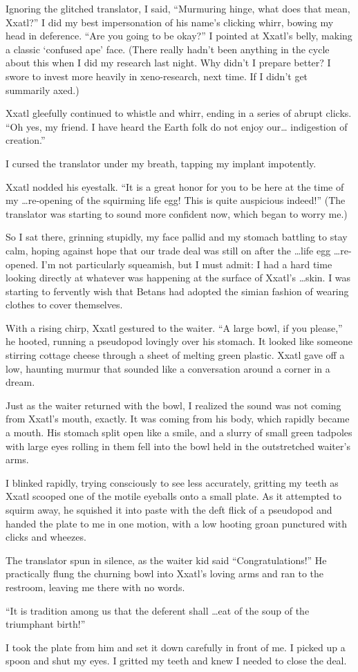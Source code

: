Ignoring the glitched translator, I said, ``Murmuring hinge, what does
that mean, Xxatl?'' I did my best impersonation of his name's clicking
whirr, bowing my head in deference. ``Are you going to be okay?'' I
pointed at Xxatl's belly, making a classic `confused ape' face. (There
really hadn't been anything in the cycle about this when I did my
research last night. Why didn't I prepare better? I swore to invest more
heavily in xeno-research, next time. If I didn't get summarily axed.)

Xxatl gleefully continued to whistle and whirr, ending in a series of
abrupt clicks. ``Oh yes, my friend. I have heard the Earth folk do not
enjoy our\ldots{} indigestion of creation.''

I cursed the translator under my breath, tapping my implant impotently.

Xxatl nodded his eyestalk. ``It is a great honor for you to be here at
the time of my \ldots re-opening of the squirming life egg! This is quite
auspicious indeed!'' (The translator was starting to sound more
confident now, which began to worry me.)

So I sat there, grinning stupidly, my face pallid and my stomach
battling to stay calm, hoping against hope that our trade deal was still
on after the \ldots life egg \ldots re-opened. I'm not particularly squeamish,
but I must admit: I had a hard time looking directly at whatever was
happening at the surface of Xxatl's \ldots skin. I was starting to fervently
wish that Betans had adopted the simian fashion of wearing clothes to
cover themselves.

With a rising chirp, Xxatl gestured to the waiter. ``A large bowl, if
you please,'' he hooted, running a pseudopod lovingly over his stomach.
It looked like someone stirring cottage cheese through a sheet of
melting green plastic. Xxatl gave off a low, haunting murmur that
sounded like a conversation around a corner in a dream.

Just as the waiter returned with the bowl, I realized the sound was not
coming from Xxatl's mouth, exactly. It was coming from his body, which
rapidly became a mouth. His stomach split open like a smile, and a
slurry of small green tadpoles with large eyes rolling in them fell into
the bowl held in the outstretched waiter's arms.

I blinked rapidly, trying consciously to see less accurately, gritting
my teeth as Xxatl scooped one of the motile eyeballs onto a small plate.
As it attempted to squirm away, he squished it into paste with the deft
flick of a pseudopod and handed the plate to me in one motion, with a
low hooting groan punctured with clicks and wheezes.

The translator spun in silence, as the waiter kid said
``Congratulations!'' He practically flung the churning bowl into Xxatl's
loving arms and ran to the restroom, leaving me there with no words.

``It is tradition among us that the deferent shall \ldots eat of the soup of
the triumphant birth!''

I took the plate from him and set it down carefully in front of me. I
picked up a spoon and shut my eyes. I gritted my teeth and knew I needed
to close the deal.

